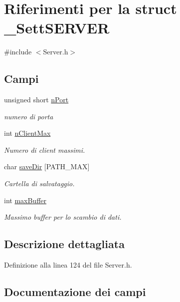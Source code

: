 \hypertarget{a00068}{}\section{Riferimenti per la struct \+\_\+\+Sett\+S\+E\+R\+V\+ER}
\label{a00068}


{\ttfamily \#include $<$Server.\+h$>$}

\subsection*{Campi}
\begin{DoxyCompactItemize}
\item 
unsigned short \mbox{\hyperlink{a00068_a54e0b59953588059d7149aaaac4a2a44}{n\+Port}}
\begin{DoxyCompactList}\small\item\em numero di porta \end{DoxyCompactList}\item 
int \mbox{\hyperlink{a00068_a50f3e08f3d29e44b0b6d55cdac597798}{n\+Client\+Max}}
\begin{DoxyCompactList}\small\item\em Numero di client massimi. \end{DoxyCompactList}\item 
char \mbox{\hyperlink{a00068_a219f1b0b585c9cdd101f3699108ba191}{save\+Dir}} \mbox{[}P\+A\+T\+H\+\_\+\+M\+AX\mbox{]}
\begin{DoxyCompactList}\small\item\em Cartella di salvataggio. \end{DoxyCompactList}\item 
int \mbox{\hyperlink{a00068_ac45bcce741ae9b25958f10d61524e622}{max\+Buffer}}
\begin{DoxyCompactList}\small\item\em Massimo buffer per lo scambio di dati. \end{DoxyCompactList}\end{DoxyCompactItemize}


\subsection{Descrizione dettagliata}


Definizione alla linea 124 del file Server.\+h.



\subsection{Documentazione dei campi}
\mbox{\label{a00068_ac45bcce741ae9b25958f10d61524e622}} 

